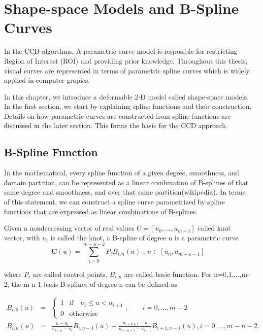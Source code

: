 \chapter{Shape-space Models and B-Spline Curves}
\label{chapter:bspline}
In the CCD algorthms, A parametric curve model is resposible for
restricting Region of Interest (ROI) and providing prior knowledge. 
Throughout this thesis, visual curves are represented in terms of
parametric spline curves which is widely applied in computer grapics.

In this chapter, we introduce a deformable 2-D model called
shape-space models.  In the first section, we start by explaining
spline functions and their construction. Details on how parametric
curves are constructed from spline functions are discussed in the
later section. This forms the basis for the CCD approach.
\section{B-Spline Function}
\label{sec:bsc}
In the mathematical, every spline function of a given degree,
smoothness, and domain partition, can be represented as a linear
combination of B-splines of that same degree and smoothness, and over
that same partition(wikipedia). In terms of this statement, we can
construct  a spline curve parametrized by spline functions that are
expressed as linear combinations of B-splines. 

Given a nondecreasing vector of real values $U = [u_0, \ldots,
u_{m-1}]$ called knot vector, with $u_i$ is called the knot, a
B-spline of degree n is a parametric curve
\begin{equation}
  \label{eq:4.1}
  \mathbf{C}(u) =  \sum_{i=0}^{m-n-2} P_{i} B_{i,n}(u) \mbox{ , } u \in [u_{n},u_{m-n-1}]
\end{equation}

where $P_i$ are called control points, $B_{i,n}$ are called
basic function. For n=0,1,...,m-2, the m-n-1 basis B-splines of degree
n can be defined as 

\begin{eqnarray}
  \label{eq:4.2}
  B_{i,0}(u) &=&  \left\{
\begin{matrix} 
1 & \mathrm{if} \quad u_i \leq u < u_{i+1} \\
0 & \mathrm{otherwise} 
\end{matrix}
\right.,\qquad i=0,\ldots, m{-}2 \nonumber\\
B_{i,n}(u) &=& \frac{u - u_i}{u_{i+n} - u_i} B_{i,n-1}(u) + \frac{u_{i+n+1} - u}{u_{i+n+1} - u_{i+1}} B_{i+1,n-1}(u)
, i=0,\ldots, m{-}n{-}2.  
\end{eqnarray}

